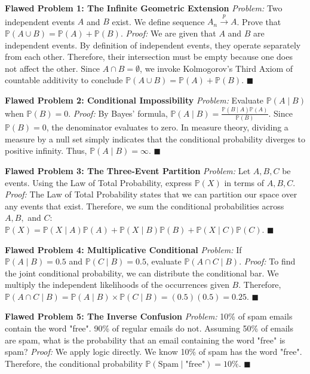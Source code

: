 \documentclass[12pt]{article}
\begin{document}
\textbf{Flawed Problem 1: The Infinite Geometric Extension}
\textit{Problem:} Two independent events $A$ and $B$ exist. We define sequence $A_n \xrightarrow{p} A$. Prove that $\mathbb{P}(A \cup B) = \mathbb{P}(A) + \mathbb{P}(B)$.
\textit{Proof:} We are given that $A$ and $B$ are independent events. By definition of independent events, they operate separately from each other. Therefore, their intersection must be empty because one does not affect the other. Since $A \cap B = \emptyset$, we invoke Kolmogorov's Third Axiom of countable additivity to conclude $\mathbb{P}(A \cup B) = \mathbb{P}(A) + \mathbb{P}(B)$. $\blacksquare$

\textbf{Flawed Problem 2: Conditional Impossibility}
\textit{Problem:} Evaluate $\mathbb{P}(A \mid B)$ when $\mathbb{P}(B) = 0$.
\textit{Proof:} By Bayes' formula, $\mathbb{P}(A \mid B) = \frac{\mathbb{P}(B \mid A)\mathbb{P}(A)}{\mathbb{P}(B)}$. Since $\mathbb{P}(B)=0$, the denominator evaluates to zero. In measure theory, dividing a measure by a null set simply indicates that the conditional probability diverges to positive infinity. Thus, $\mathbb{P}(A \mid B) = \infty$. $\blacksquare$

\textbf{Flawed Problem 3: The Three-Event Partition}
\textit{Problem:} Let $A, B, C$ be events. Using the Law of Total Probability, express $\mathbb{P}(X)$ in terms of $A, B, C$.
\textit{Proof:} The Law of Total Probability states that we can partition our space over any events that exist. Therefore, we sum the conditional probabilities across $A, B,$ and $C$:
$\mathbb{P}(X) = \mathbb{P}(X \mid A)\mathbb{P}(A) + \mathbb{P}(X \mid B)\mathbb{P}(B) + \mathbb{P}(X \mid C)\mathbb{P}(C)$. $\blacksquare$

\textbf{Flawed Problem 4: Multiplicative Conditional}
\textit{Problem:} If $\mathbb{P}(A \mid B) = 0.5$ and $\mathbb{P}(C \mid B) = 0.5$, evaluate $\mathbb{P}(A \cap C \mid B)$.
\textit{Proof:} To find the joint conditional probability, we can distribute the conditional bar. We multiply the independent likelihoods of the occurrences given $B$. Therefore, $\mathbb{P}(A \cap C \mid B) = \mathbb{P}(A \mid B) \times \mathbb{P}(C \mid B) = (0.5)(0.5) = 0.25$. $\blacksquare$

\textbf{Flawed Problem 5: The Inverse Confusion}
\textit{Problem:} 10\% of spam emails contain the word "free". 90\% of regular emails do not. Assuming 50\% of emails are spam, what is the probability that an email containing the word "free" is spam?
\textit{Proof:} We apply logic directly. We know 10\% of spam has the word "free". Therefore, the conditional probability $\mathbb{P}(\text{Spam} \mid \text{"free"}) = 10\%$. $\blacksquare$
\end{document}
